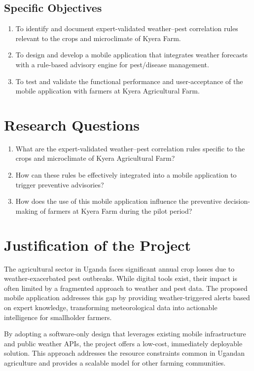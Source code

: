 \documentclass[12pt]{report}
\begin{document}
\subsection{Specific Objectives}
\begin{enumerate}
    \item To identify and document expert-validated weather--pest correlation rules relevant to the crops and microclimate of Kyera Farm.
    \item To design and develop a mobile application that integrates weather forecasts with a rule-based advisory engine for pest/disease management.
    \item To test and validate the functional performance and user-acceptance of the mobile application with farmers at Kyera Agricultural Farm.
\end{enumerate}

\section{Research Questions}
\begin{enumerate}
    \item What are the expert-validated weather--pest correlation rules specific to the crops and microclimate of Kyera Agricultural Farm?
    \item How can these rules be effectively integrated into a mobile application to trigger preventive advisories?
    \item How does the use of this mobile application influence the preventive decision-making of farmers at Kyera Farm during the pilot period?
\end{enumerate}

\section{Justification of the Project}
The agricultural sector in Uganda faces significant annual crop losses due to weather-exacerbated pest outbreaks. While digital tools exist, their impact is often limited by a fragmented approach to weather and pest data. The proposed mobile application addresses this gap by providing weather-triggered alerts based on expert knowledge, transforming meteorological data into actionable intelligence for smallholder farmers.

By adopting a software-only design that leverages existing mobile infrastructure and public weather APIs, the project offers a low-cost, immediately deployable solution. This approach addresses the resource constraints common in Ugandan agriculture and provides a scalable model for other farming communities.
\end{document}
